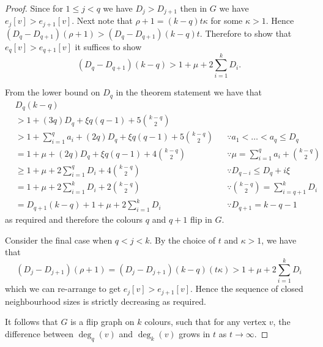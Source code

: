 \documentclass[10pt,a4paper]{amsart}
\begin{document}
\begin{proof}
Since for $1 \leq j < q$ we have $D_j > D_{j+1}$ then in $G$ we have $e_j [v] > e_{j+1} [v]$. Next note that $\rho + 1 = (k-q)t\kappa$ for some $\kappa > 1$. Hence $(D_q - D_{q + 1})(\rho + 1) > (D_q - D_{q+1})(k-q)t$. Therefore to show that $e_q [v] > e_{q+1} [v]$ it suffices to show $$(D_q - D_{q+1})(k-q) > 1 + \mu + 2\sum\limits_{i=1}^k D_i.$$ 

From the lower bound on $D_q$ in the theorem statement we have that
\begin{align*}
	&D_q (k - q) &&\\
	&> 1 + (3q)D_q + \xi q(q-1) +  5\binom{k-q}{2} &&\\
	&> 1 + \sum\limits_{i = 1}^q a_i + (2q)D_q + \xi q(q-1) +  5\binom{k-q}{2} && \because a_1 < \dots < a_q \leq D_q\\
	&= 1 + \mu + (2q)D_q + \xi q(q-1) +  4\binom{k-q}{2} && \because \mu = \sum\limits_{i = 1}^q a_i + \binom{k-q}{2}\\
	&\geq 1 + \mu + 2\sum_{i=1}^q D_i + 4\binom{k-q}{2} && \because D_{q-i} \leq D_q + i\xi\\
	&= 1 + \mu + 2\sum_{i=1}^k D_i + 2\binom{k-q}{2} && \because \binom{k-q}{2} = \sum\limits_{i = q + 1}^{k} D_i\\
	&= D_{q+1} (k - q) + 1 + \mu + 2\sum_{i=1}^k D_i && \because D_{q+1} = k - q - 1
\end{align*}
as required and therefore the colours $q$ and $q+1$ flip in $G$.

Consider the final case when $q < j < k$. By the choice of $t$ and $\kappa > 1$, we have that $$(D_j - D_{j + 1})(\rho + 1) = (D_j - D_{j+1})(k-q)(t\kappa) > 1 + \mu + 2\sum\limits_{i = 1}^k D_i$$ which we can re-arrange to get $e_j [v] > e_{j+1} [v]$. Hence the sequence of closed neighbourhood sizes is strictly decreasing as required.

It follows that $G$ is a flip graph on $k$ colours, such that for any vertex $v$,  the difference between $\deg_q (v)$ and $\deg_k (v)$ grows in $t$ as $t \to \infty$.
\end{proof}
\end{document}
